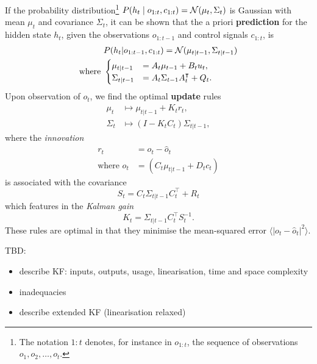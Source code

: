         If the probability distribution\footnote{The notation $1:t$ denotes, for instance in $o_{1:t}$, the sequence of observations $o_1, o_2, \ldots, o_t$.} $P(h_t \mid o_{1:t}, c_{1:t}) = \mathcal{N}(\mu_t, \Sigma_t)$ is Gaussian with mean $\mu_t$ and covariance $\Sigma_t$, it can be shown that the a priori \textbf{prediction} for the hidden state $h_t$, given the observations $o_{1:t-1}$ and control signals $c_{1:t}$, is
        \begin{align}
            &P(h_t | o_{1:t-1}, c_{1:t}) = \mathcal{N}(\mu_{t|t-1}, \Sigma_{t|t-1}) \\
            \text{where }
            &\begin{cases}
                \mu_{t|t-1} &= A_t \mu_{t-1} + B_t u_t, \\
                \Sigma_{t|t-1} &= A_t \Sigma_{t-1} A_t^\intercal + Q_t.
            \end{cases}
        \end{align}
        Upon observation of $o_t$, we find the optimal \textbf{update} rules
        \begin{align}
            \mu_t &\mapsto \mu_{t|t-1} + K_t r_t, \\
            \Sigma_t &\mapsto (I - K_t C_t) \Sigma_{t|t-1},
        \end{align}
        where the \emph{innovation}
        \begin{align}
            r_t &= o_t - \hat{o}_t \\
            \text{where }\hat{o}_t &= (C_t \mu_{t|t-1} + D_t c_t)
        \end{align}
        is associated with the covariance
        \begin{equation}
            S_t = C_t \Sigma_{t|t-1} C_t^\intercal + R_t
        \end{equation}
        which features in the \emph{Kalman gain}
        \begin{equation}
            K_t = \Sigma_{t|t-1} C_t^\intercal S_t^{-1}.
        \end{equation}
        These rules are optimal in that they minimise the mean-squared error $\langle \lvert o_t - \hat{o}_t \rvert^2 \rangle$.


        TBD:
        \begin{itemize}
            \item describe KF: inputs, outputs, usage, linearisation, time and space complexity
            \item inadequacies
            \item describe extended KF (linearisation relaxed)
        \end{itemize}


